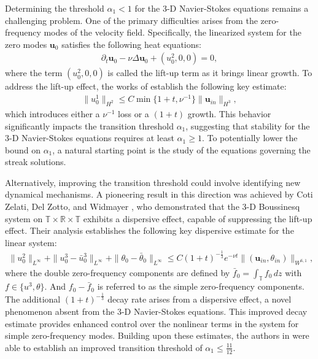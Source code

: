 \documentclass[11pt,reqno]{article}
\numberwithin{equation}{section}
\newcommand\R{{\mathbb R}}
\newcommand\T{{\mathbb T}}
\newcommand\uu{\bm{u}}
\let\pa=\partial
\begin{document}
Determining the threshold $\alpha_1<1$ for the 3-D Navier-Stokes equations remains a challenging problem. One of the primary difficulties arises from the zero-frequency modes of the velocity field. Specifically, the linearized system for the zero modes $\uu_0$ satisfies the following heat equations:
\begin{align*}
\pa_t \uu_0-\nu\Delta \uu_0+(u_0^2, 0, 0)=0,
\end{align*}
where the term $(u_0^2, 0, 0)$ is called the lift-up term as it brings linear growth. 
To address the lift-up effect, the works of \cite{Bedrossian-Germain-Masmoudi-2017, CWZ-MAMS, WZ-cpam}  
establish the following key estimate:
\begin{align}\label{est-NS}
\|u^1_0\|_{H^2} \leq C\min\{1+t, \nu^{-1}\} \|\uu_{in}\|_{H^3},
\end{align}
which introduces either a $\nu^{-1}$ loss or a $(1+t)$ growth. This behavior significantly impacts the transition threshold $\alpha_1$, suggesting that stability for the 3-D Navier-Stokes equations requires at least $\alpha_1\geq 1$. To potentially lower the bound on $\alpha_1$, a natural starting point is the study of the equations governing the streak solutions. 

Alternatively, improving the transition threshold could involve identifying new dynamical mechanisms. A pioneering result in this direction was achieved by Coti Zelati, Del Zotto, and Widmayer \cite{Coti-Zotto, Coti-Zotto-Widmayer}, who demonstrated that the 3-D Boussinesq system 
on $\T\times\R\times\T$
exhibits a dispersive effect, capable of suppressing the lift-up effect. Their analysis establishes the following key dispersive estimate for the linear system:
\begin{align*}
\| u^2_0 \|_{L^{\infty}} +\| u_0^3-\bar{u}^3_0 \|_{L^{\infty}}+\| \theta_0-\bar{\theta}_0 \|_{L^{\infty}} \leq C (1+t)^{-\frac13} e^{-\nu t} \|(\uu_{in}, \theta_{in})\|_{W^{6,1}},
\end{align*}
where the double zero-frequency components are defined by $\bar{f}_0=\int_\T f_0\,dz$ with $f\in\{u^3, \theta\}$. 
And $f_0-\bar{f}_0$ is referred to as the simple zero-frequency components.
The additional $(1+t)^{-\frac13}$  decay rate arises from a dispersive effect, a novel phenomenon absent from the 3-D Navier-Stokes equations.
This improved decay estimate provides enhanced control over the nonlinear terms in the system for simple zero-frequency  modes. Building upon these estimates, the authors in \cite{Coti-Zotto-Widmayer} were able to establish an improved transition threshold of $\alpha_1\leq \frac{11}{12}$.
\end{document}

